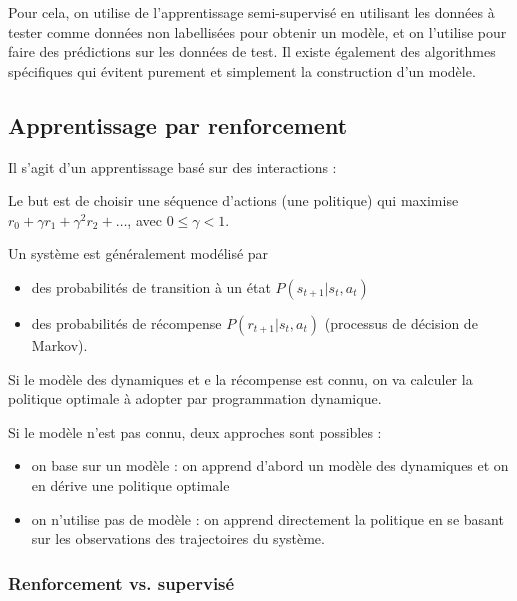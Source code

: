 		Pour cela, on utilise de l'apprentissage semi-supervisé en utilisant les données à tester comme données non labellisées  pour obtenir un modèle, et on l'utilise pour faire des prédictions sur les données de test. Il existe également des algorithmes spécifiques qui évitent purement et simplement la construction d'un modèle.
		
		\subsection{Apprentissage par renforcement}
		
		Il s'agit d'un apprentissage basé sur des interactions :
		
		
		Le but est de choisir une séquence d'actions (une politique) qui maximise $r_0 + \gamma r_1 + \gamma^2 r_2 + \dots$, avec $0 \leq \gamma < 1$.
		
		
		Un système est généralement modélisé par
		
		\begin{itemize}
			\item des probabilités de transition à un état $P(s_{t + 1} \vert s_t, a_t)$
			\item des probabilités de récompense $P(r_{t + 1} \vert s_t, a_t)$ 		(processus de décision de Markov).
		\end{itemize}
		
		Si le modèle des dynamiques et e la récompense est connu, on va calculer la politique optimale à adopter par programmation dynamique.
		
		Si le modèle n'est pas connu, deux approches sont possibles :
		
		\begin{itemize}
			\item on base sur un modèle : on apprend d'abord un modèle des dynamiques et on en dérive une politique optimale
			\item on n'utilise pas de modèle : on apprend directement la politique en se basant sur les observations des trajectoires du système.
		\end{itemize}
		
			\subsubsection{Renforcement vs. supervisé}
			
